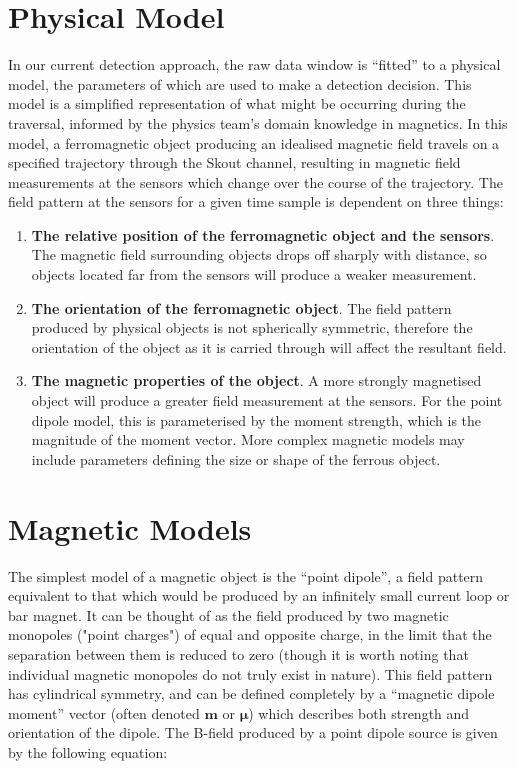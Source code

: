 \documentclass[10pt, a4paper, twocolumn]{article} %
\begin{document}

\section{Physical Model}

In our current detection approach, the raw data window is “fitted” to a physical model, the parameters of which are used to make a detection decision. This model is a simplified representation of what might be occurring during the traversal, informed by the physics team's domain knowledge in magnetics. In this model, a ferromagnetic object producing an idealised magnetic field travels on a specified trajectory through the Skout channel, resulting in magnetic field measurements at the sensors which change over the course of the trajectory. The field pattern at the sensors for a given time sample is dependent on three things:

\begin{enumerate}
	\item \textbf{The relative position of the ferromagnetic object and the sensors}. The magnetic field surrounding objects drops off sharply with distance, so objects located far from the sensors will produce a weaker measurement.
	
	\item \textbf{The orientation of the ferromagnetic object}. The field pattern produced by physical objects is not spherically symmetric, therefore the orientation of the object as it is carried through will affect the resultant field.
	
	\item \textbf{The magnetic properties of the object}. A more strongly magnetised object will produce a greater field measurement at the sensors. For the point dipole model, this is parameterised by the moment strength, which is the magnitude of the moment vector. More complex magnetic models may include parameters defining the size or shape of the ferrous object.
\end{enumerate}

\section{Magnetic Models}

The simplest model of a magnetic object is the “point dipole”, a field pattern equivalent to that which would be produced by an infinitely small current loop or bar magnet. It can be thought of as the field produced by two magnetic monopoles ("point charges") of equal and opposite charge, in the limit that the separation between them is reduced to zero (though it is worth noting that individual magnetic monopoles do not truly exist in nature). This field pattern has cylindrical symmetry, and can be defined completely by a “magnetic dipole moment” vector (often denoted $\mathbf{m}$ or $\boldsymbol{\mu}$) which describes both strength and orientation of the dipole. The B-field produced by a point dipole source is given by the following equation:
\end{document}
